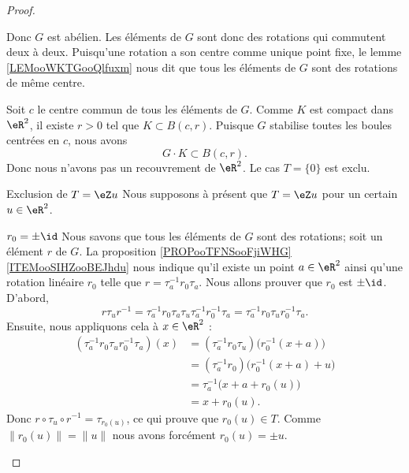\begin{proof}
\begin{subproof}
		Donc \( G\) est abélien. Les éléments de \( G\) sont donc des rotations qui commutent deux à deux. Puisqu'une rotation a son centre comme unique point fixe, le lemme \ref{LEMooWKTGooQlfuxm} nous dit que tous les éléments de \( G\) sont des rotations de même centre.

		Soit \( c\) le centre commun de tous les éléments de \( G\). Comme \( K\) est compact dans \( \eR^2\), il existe \( r>0\) tel que \( K\subset B(c,r)\). Puisque \( G\) stabilise toutes les boules centrées en \( c\), nous avons
		\begin{equation}
			G\cdot K\subset B(c,r).
		\end{equation}
		Donc nous n'avons pas un recouvrement de \( \eR^2\). Le cas \( T=\{0 \}\) est exclu.

		\item[Exclusion de \( T=\eZ u\)]
		Nous supposons à présent que \( T=\eZ u\) pour un certain \( u\in \eR^2\).

		\begin{subproof}
			\item[\( r_0=\pm\id\)]
			Nous savons que tous les éléments de \( G\) sont des rotations; soit un élément \( r\) de \( G\). La proposition
			\ref{PROPooTFNSooFjiWHG}\ref{ITEMooSIHZooBEJhdu} nous indique qu'il existe un point \( a\in \eR^2\) ainsi qu'une rotation linéaire \( r_0\) telle que \( r=\tau_a^{-1}r_0\tau_a\). Nous allons prouver que \( r_0\) est \( \pm\id\). D'abord,
			\begin{equation}
				r\tau_u r^{-1}=\tau_a^{-1} r_0 \tau_a \tau_u \tau_a^{-1} r_0^{-1} \tau_a = \tau_a^{-1} r_0 \tau_u r_0^{-1} \tau_a.
			\end{equation}
			Ensuite, nous appliquons cela à \( x\in \eR^2\) :
			\begin{subequations}
				\begin{align}
					(\tau_a^{-1} r_0 \tau_u r_0^{-1} \tau_a)(x) & =(\tau_a^{-1} r_0 \tau_u)\big( r_0^{-1}(x+a) \big)    \\
					                                            & =(\tau_a^{-1} r_0)\big( r_0^{-1}(x+a)+u \big)         \\
					                                            & =\tau_a^{-1}\big( x+a+r_0(u) \big)                    \\
					                                            & =x+r_0(u).
				\end{align}
			\end{subequations}
			Donc \( r\circ\tau_u\circ r^{-1}=\tau_{r_0(u)}\), ce qui prouve que \( r_0(u)\in T\). Comme \( \| r_0(u) \|=\| u \|\) nous avons forcément \( r_0(u)=\pm u\).


\end{subproof}
\end{subproof}
\end{proof}
